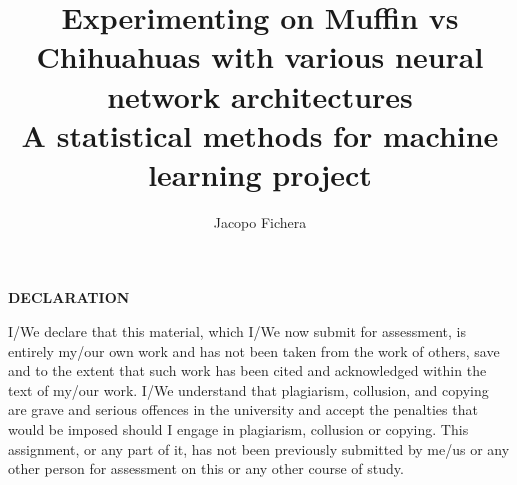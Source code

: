 \documentclass[a4paper]{article}
\title{Experimenting on Muffin vs Chihuahuas with various neural network architectures \\
\large A statistical methods for machine learning project }
\author{Jacopo Fichera}
\begin{document}
    \maketitle

    \leavevmode%
    \vfill\noindent
    \begin{center}
        \textbf{DECLARATION}
    \end{center}
    I/We declare that this material, which I/We now submit for assessment, is entirely my/our own work and has not been taken from the work of others, save and to the extent that such work has been cited and acknowledged within the text of my/our work. I/We understand that plagiarism, collusion, and copying are grave and serious offences in the university and accept the penalties that would be imposed should I engage in plagiarism, collusion or copying. This assignment, or any part of it, has not been previously submitted by me/us or any other person for assessment on this or any other course of study.
    \newpage
    \tableofcontents

    
    
    
    
    
    
    
    \newpage
    
\end{document}
